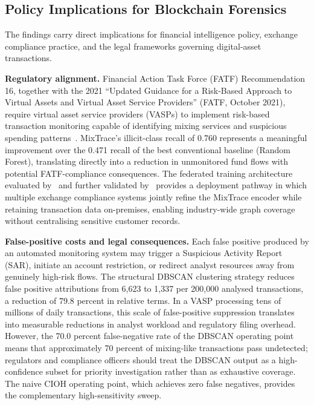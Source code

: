 \documentclass[12pt,a4paper]{article}
\begin{document}
\subsection{Policy Implications for Blockchain Forensics}

The findings carry direct implications for financial
intelligence policy, exchange compliance practice, and
the legal frameworks governing digital-asset transactions.

\textbf{Regulatory alignment.}
Financial Action Task Force (FATF) Recommendation 16,
together with the 2021 ``Updated Guidance for a
Risk-Based Approach to Virtual Assets and Virtual Asset
Service Providers'' (FATF, October 2021), require virtual
asset service providers (VASPs) to implement risk-based
transaction monitoring capable of identifying mixing
services and suspicious spending patterns~\citep{lo2023}.
MixTrace's illicit-class recall of 0.760 represents a
meaningful improvement over the 0.471 recall of the best
conventional baseline (Random Forest), translating directly
into a reduction in unmonitored fund flows with potential
FATF-compliance consequences. The federated training
architecture evaluated by~\citet{baabdullah2024} and
further validated by~\citet{ahmed2024fed} provides a
deployment pathway in which multiple exchange compliance
systems jointly refine the MixTrace encoder while
retaining transaction data on-premises, enabling
industry-wide graph coverage without centralising
sensitive customer records.

\textbf{False-positive costs and legal consequences.}
Each false positive produced by an automated monitoring
system may trigger a Suspicious Activity Report (SAR),
initiate an account restriction, or redirect analyst
resources away from genuinely high-risk flows. The
structural DBSCAN clustering strategy reduces false
positive attributions from 6,623 to 1,337 per 200,000
analysed transactions, a reduction of 79.8 percent in
relative terms. In a VASP processing tens of millions of
daily transactions, this scale of false-positive
suppression translates into measurable reductions in
analyst workload and regulatory filing overhead. However,
the 70.0 percent false-negative rate of the DBSCAN
operating point means that approximately 70 percent of
mixing-like transactions pass undetected; regulators and
compliance officers should treat the DBSCAN output as a
high-confidence subset for priority investigation rather
than as exhaustive coverage. The naive CIOH operating
point, which achieves zero false negatives, provides the
complementary high-sensitivity sweep.
\end{document}
